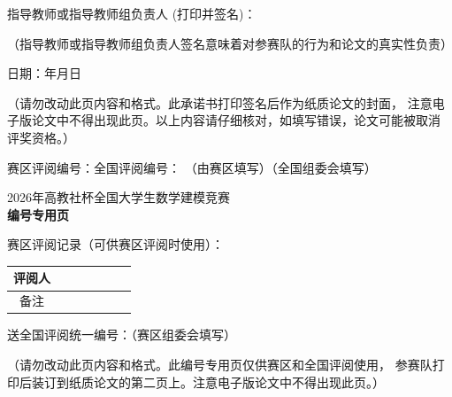 \documentclass[12pt]{ctexart}
\begin{document}
指导教师或指导教师组负责人 (打印并签名)：\uline{\hspace{8em}}

（指导教师或指导教师组负责人签名意味着对参赛队的行为和论文的真实性负责）

\vspace{1em}
\hfill 日期：\uline{\hspace{2em}}年\uline{\hspace{1.5em}}月\uline{\hspace{1.5em}}日

\vspace{2em}
{\noindent\kaishu （请勿改动此页内容和格式。此承诺书打印签名后作为纸质论文的封面，
注意电子版论文中不得出现此页。以上内容请仔细核对，如填写错误，论文可能被取消
评奖资格。）}

\newpage
{\noindent 赛区评阅编号：\uline{\hspace{6em}}\hfill 全国评阅编号：\uline{\hspace{6em}}}
{\noindent \hspace{2em}（由赛区填写）\hfill （全国组委会填写）}

\vspace{2em}
\begin{center}
    {\LARGE\heiti 2026年高教社杯全国大学生数学建模竞赛}\\[1em]
    {\huge\bfseries 编\hspace{0.5em}号\hspace{0.5em}专\hspace{0.5em}用\hspace{0.5em}页}
\end{center}

\vspace{3em}
{\noindent 赛区评阅记录（可供赛区评阅时使用）：}

\vspace{1em}
\begin{center}
\begin{tabular}{|c|p{2.6cm}|p{2.6cm}|p{2.6cm}|p{2.6cm}|p{2.6cm}|p{2.6cm}|}
\hline
评阅人 & & & & & & \\\hline
备注   & & & & & & \\\hline
\end{tabular}
\end{center}

\vspace{3em}
{\noindent 送全国评阅统一编号：\hspace{1em}（赛区组委会填写）}

\vfill
{\noindent\kaishu （请勿改动此页内容和格式。此编号专用页仅供赛区和全国评阅使用，
参赛队打印后装订到纸质论文的第二页上。注意电子版论文中不得出现此页。）}
\end{document}
